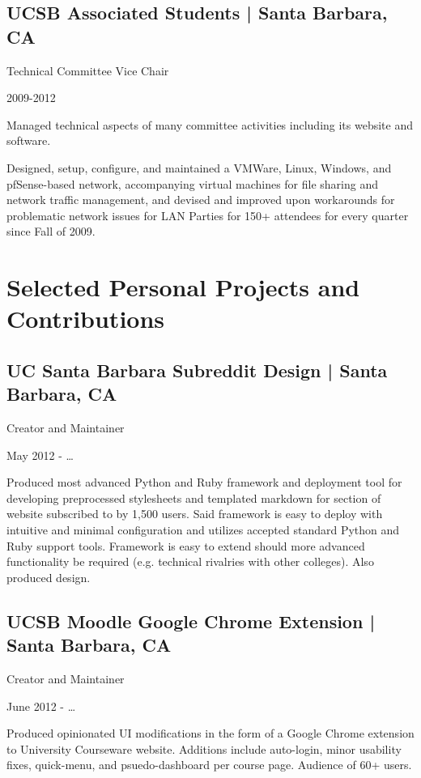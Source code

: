 \documentclass[10pt, letter]{article}
\newcommand{\years}[1]{\marginnote{#1}}
\renewcommand{\years}[1]{#1}
\begin{document}
\begin{multicols}{2}
\subsection*{UCSB Associated Students | {\footnotesize{Santa Barbara, CA}}}

Technical Committee Vice Chair

\years{2009-2012}

Managed technical aspects of many committee activities including its website
and software.

Designed, setup, configure, and maintained a VMWare, Linux, Windows, and
pfSense-based network, accompanying virtual machines for file sharing and
network traffic management, and devised and improved upon workarounds for
problematic network issues for LAN Parties for 150+ attendees for every
quarter since Fall of 2009.

\section*{Selected Personal Projects and Contributions}

\subsection*{UC Santa Barbara Subreddit Design | {\footnotesize{Santa Barbara, CA}}}

Creator and Maintainer

\years{May 2012 - \ldots}

Produced most advanced Python and Ruby framework and deployment tool for
developing preprocessed stylesheets and templated markdown for section of
website subscribed to by 1,500 users. Said framework is easy to deploy with
intuitive and minimal configuration and utilizes accepted standard Python and
Ruby support tools. Framework is easy to extend should more advanced
functionality be required (e.g. technical rivalries with other colleges). Also
produced design.

\subsection*{UCSB Moodle Google Chrome Extension | {\footnotesize{Santa Barbara, CA}}}

Creator and Maintainer

\years{June 2012 - \ldots}

Produced opinionated UI modifications in the form of a Google Chrome extension
to University Courseware website. Additions include auto-login, minor usability
fixes, quick-menu, and psuedo-dashboard per course page. Audience of 60+ users.


\end{multicols}
\end{document}

